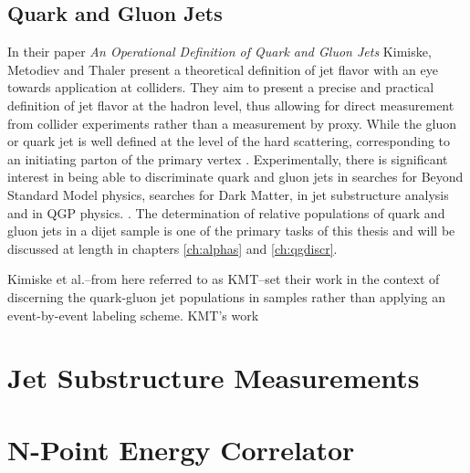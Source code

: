 \subsection{Quark and Gluon Jets}	
	In their paper \textit{An Operational Definition of Quark and Gluon Jets} \cite{Komiske2018} Kimiske, Metodiev and Thaler present a theoretical definition of jet flavor with an eye towards application at colliders. 
	They aim to present a precise and practical definition of jet flavor at the hadron level, thus allowing for direct measurement from collider experiments rather than a measurement by proxy. 
	While the gluon or quark jet is well defined at the level of the hard scattering, corresponding to an initiating parton of the primary vertex \cite{Jones1989} \cite{Fodor1990}. 
	Experimentally, there is significant interest in being able to discriminate quark and gluon jets in searches for Beyond Standard Model physics, searches for Dark Matter, in jet substructure analysis and in QGP physics. \cite{Gallicchio2011}\cite{Lima2017}\cite{Bhattacherjee2017}\cite{}. 
	The determination of relative populations of quark and gluon jets in a dijet sample is one of the primary tasks of this thesis and will be discussed at length in chapters \ref{ch:alphas} and \ref{ch:qgdiscr}. 

	Kimiske et al.--from here referred to as KMT--set their work in the context of discerning the quark-gluon jet populations in samples rather than applying an event-by-event labeling scheme. 
	KMT's work 
\section{Jet Substructure Measurements}

\section{N-Point Energy Correlator}
%
